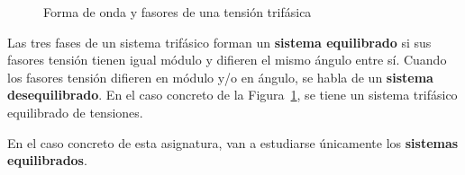 \documentclass[11pt]{book} %
\numberwithin{dummy}{section}
\theoremstyle{ocrenumbox}
\theoremstyle{blacknumex}
\theoremstyle{blacknumbox}
\theoremstyle{ocrenum}
\newenvironment{remark}{\par\vspace{10pt}\small %
\begin{list}{}{
\leftmargin=35pt %
\rightmargin=25pt}\item\ignorespaces %
\makebox[-2.5pt]{\begin{tikzpicture}[overlay]
\node[draw=ocre!60,line width=1pt,circle,fill=ocre!25,font=\sffamily\bfseries,inner sep=2pt,outer sep=0pt] at (-15pt,0pt){\textcolor{ocre}{N}};\end{tikzpicture}} %
\advance\baselineskip -1pt}{\end{list}\vskip5pt} %
\newlength\esp
\begin{document}
	\begin{figure}
		\centering
		 \hfill
		\caption{Forma de onda y fasores de una tensión trifásica}
		\label{fig.tensiontrifasica}
	\end{figure}
	
	Las tres fases de un sistema trifásico forman un \textbf{sistema equilibrado} si sus fasores tensión tienen igual módulo y difieren el mismo ángulo entre sí. Cuando los fasores tensión difieren en módulo
	y/o en ángulo, se habla de un \textbf{sistema desequilibrado}. En el caso concreto de la Figura~\ref{fig.tensiontrifasica}, se tiene un sistema trifásico equilibrado de tensiones. 
	\begin{remark}
		En el caso concreto de esta asignatura, van a estudiarse únicamente los \textbf{sistemas equilibrados}.
	\end{remark}
	
\end{document}
